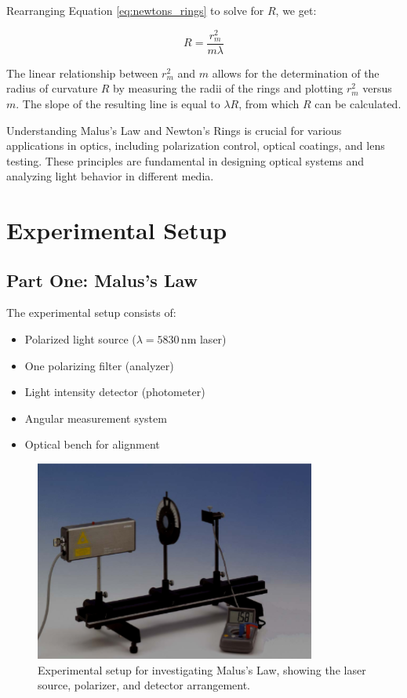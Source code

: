 \documentclass[journal]{IEEEtran}
\begin{document}
Rearranging Equation \ref{eq:newtons_rings} to solve for $R$, we get:

\begin{equation}
    R = \frac{r_m^2}{m \lambda}
    \label{eq:radius_of_curvature}
\end{equation}

The linear relationship between $r_m^2$ and $m$ allows for the determination of the radius of curvature $R$ by measuring the radii of the rings and plotting $r_m^2$ versus $m$. The slope of the resulting line is equal to $\lambda R$, from which $R$ can be calculated.

Understanding Malus's Law and Newton's Rings is crucial for various applications in optics, including polarization control, optical coatings, and lens testing. These principles are fundamental in designing optical systems and analyzing light behavior in different media.

\section{Experimental Setup}

\subsection{Part One: Malus's Law}
The experimental setup consists of:
\begin{itemize}
    \item Polarized light source ($\lambda = 5830 \, \text{nm}$ laser)
    \item One polarizing filter (analyzer)
    \item Light intensity detector (photometer)
    \item Angular measurement system
    \item Optical bench for alignment
\end{itemize}

\begin{figure}[H]
    \centering
    \includegraphics[width=0.8\linewidth]{../IMAGES/malus_law_setup.png}
    \caption{Experimental setup for investigating Malus's Law, showing the laser source, polarizer, and detector arrangement.}
    \label{fig:malus_setup}
\end{figure}
\end{document}
